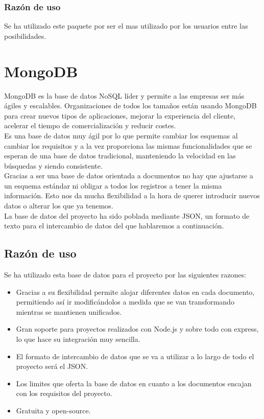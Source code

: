 \subsubsection{Razón de uso}
Se ha utilizado este paquete por ser el mas utilizado por los usuarios entre las posibilidades. 

\section{MongoDB}
MongoDB\cite{mongo} es la base de datos NoSQL líder y permite a las empresas ser más ágiles y escalables. Organizaciones de todos los tamaños están usando MongoDB para crear nuevos tipos de aplicaciones, mejorar la experiencia del cliente, acelerar el tiempo de comercialización y reducir costes.\\

Es una base de datos muy ágil por lo que permite cambiar los esquemas al cambiar los requisitos y a la vez proporciona las mismas funcionalidades que se esperan de una base de datos tradicional, manteniendo la velocidad en las búsquedas y siendo consistente.\\

Gracias a ser una base de datos orientada a documentos no hay que ajustarse a un esquema estándar ni obligar a todos los registros a tener la misma información. Esto nos da mucha flexibilidad a la hora de querer introducir nuevos datos o alterar los que ya tenemos.\\

La base de datos del proyecto ha sido poblada mediante JSON, un formato de texto para el intercambio de datos del que hablaremos a continuación. 

\subsection{Razón de uso}
Se ha utilizado esta base de datos para el proyecto por las siguientes razones:

\begin{itemize}
	\item Gracias a su flexibilidad permite alojar diferentes datos en cada documento, permitiendo así ir modificándolos a medida que se van transformando mientras se mantienen unificados.
	\item Gran soporte para proyectos realizados con Node.js y sobre todo con express, lo que hace su integración muy sencilla.
	\item El formato de intercambio de datos que se va a utilizar a lo largo de todo el proyecto será el JSON.
	\item Los limites que oferta la base de datos en cuanto a los documentos encajan con los requisitos del proyecto.
	\item Gratuita y open-source.
\end{itemize}

